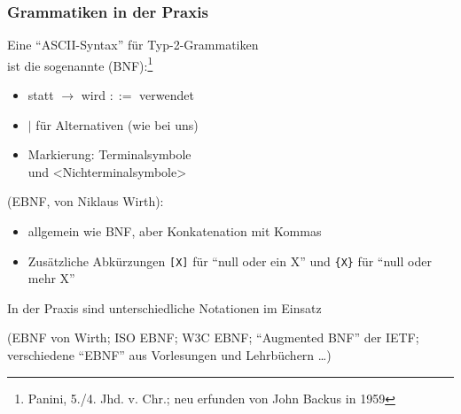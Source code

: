 \documentclass[aspectratio=1610,onlymath]{beamer}
\begin{document}
\begin{frame}\frametitle{Grammatiken in der Praxis}

Eine "`ASCII-Syntax"' für Typ-2-Grammatiken\\ ist die sogenannte  (BNF):\footnote{Panini, 5./4. Jhd. v. Chr.; neu erfunden von John Backus in 1959}

\begin{itemize}
\item statt $\to$ wird \alert{$\mathtt{::=}$} verwendet 
\item \alert{$\mid$} für Alternativen (wie bei uns)
\item Markierung: \alert{\squote}Terminalsymbole\alert{\squote}\\
      und {\alert{$\texttt{<}$}Nichterminalsymbole\alert{$\texttt{>}$}}
\end{itemize}

%
\pause{} (EBNF, von Niklaus Wirth):
\begin{itemize}
\item allgemein wie BNF, aber Konkatenation mit Kommas
\item Zusätzliche Abkürzungen \alert{\texttt{[X]}} für "`null oder ein X"' und \alert{\texttt{\{X\}}} für "`null oder mehr X"'
\end{itemize}

\alert{In der Praxis sind unterschiedliche Notationen im Einsatz}

{\footnotesize (EBNF von Wirth; ISO EBNF; W3C EBNF; "`Augmented BNF"' der IETF; verschiedene "`EBNF"' aus Vorlesungen und Lehrbüchern \ldots)}

\end{frame}


\end{document}
